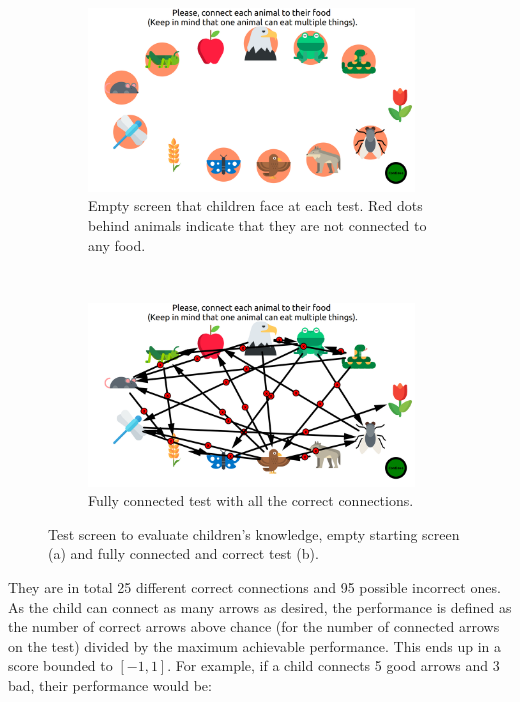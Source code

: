 \begin{figure}[ht]
	\centering
	\begin{subfigure}[t]{0.5\textwidth}
		\centering
		\includegraphics[width=0.95\textwidth]{empty_graph.png}
		\captionsetup{width=.95\linewidth}
		\caption{Empty screen that children face at each test. Red dots behind animals indicate that they are not connected to any food.}
	\end{subfigure}%
	~ 
	\begin{subfigure}[t]{0.5\textwidth}
		\centering
		\includegraphics[width=0.95\textwidth]{full_graph.png}
		\captionsetup{width=.95\linewidth}
		\caption{Fully connected test with all the correct connections.}
	\end{subfigure}
	\caption{Test screen to evaluate children's knowledge, empty starting screen (a) and fully connected and correct test (b).}
	\label{fig:test}
\end{figure}
They are in total 25 different correct connections and 95 possible incorrect ones. As the child can connect as many arrows as desired, the performance is defined as the number of correct arrows above chance (for the number of connected arrows on the test) divided by the maximum achievable performance. This ends up in a score bounded to $[-1,1]$. For example, if a child connects 5 good arrows and 3 bad, their performance would be:

